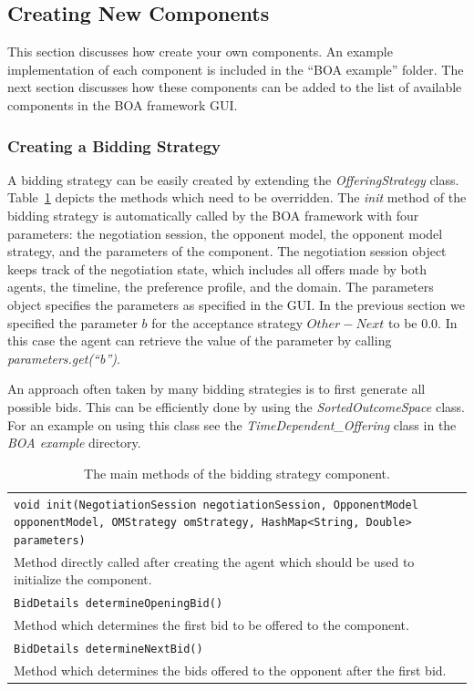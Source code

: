 \documentclass[]{article}
\begin{document}
\subsection{Creating New Components}
This section discusses how create your own components. An example implementation of each component is included in the ``BOA example'' folder. The next section discusses how these components can be added to the list of available components in the BOA framework GUI.

\subsubsection{Creating a Bidding Strategy}
A bidding strategy can be easily created by extending the \textit{OfferingStrategy} class. Table~\ref{tab:BOAbs} depicts the methods which need to be overridden. The \textit{init} method of the bidding strategy is automatically called by the BOA framework with four parameters: the negotiation session, the opponent model, the opponent model strategy, and the parameters of the component. The negotiation session object keeps track of the negotiation state, which includes all offers made by both agents, the timeline, the preference profile, and the domain. The parameters object specifies the parameters as specified in the GUI. In the previous section we specified the parameter $b$ for the acceptance strategy $Other - Next$ to be 0.0. In this case the agent can retrieve the value of the parameter by calling \textit{parameters.get(``b'')}.

An approach often taken by many bidding strategies is to first generate all possible bids. This can be efficiently done by using the \textit{SortedOutcomeSpace} class. For an example on using this class see the \textit{TimeDependent\_Offering} class in the \textit{BOA example} directory.

\begin{table}[h]
\begin{tabular}{m{}}
\hline
\texttt{void init(NegotiationSession negotiationSession, OpponentModel opponentModel, 
						OMStrategy omStrategy, HashMap<String, Double> parameters)}\\
Method directly called after creating the agent which should be used to initialize the component.\\
\hline
\texttt{BidDetails determineOpeningBid()}\\
Method which determines the first bid to be offered to the component.\\
\hline
\texttt{BidDetails determineNextBid()}\\
Method which determines the bids offered to the opponent after the first bid.\\
\hline
\end{tabular}
\caption{The main methods of the bidding strategy component.}
\label{tab:BOAbs}
\end{table}
\end{document}
